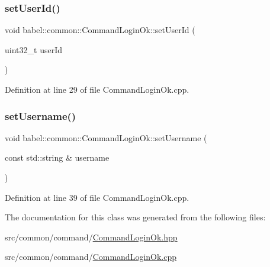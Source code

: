 \subsubsection{\texorpdfstring{set\+User\+Id()}{setUserId()}}
{\footnotesize\ttfamily void babel\+::common\+::\+Command\+Login\+Ok\+::set\+User\+Id (\begin{DoxyParamCaption}\item[{uint32\+\_\+t}]{user\+Id }\end{DoxyParamCaption})}



Definition at line 29 of file Command\+Login\+Ok.\+cpp.

\mbox{\label{classbabel_1_1common_1_1_command_login_ok_ad01f7bbbb944b3fe0f42fcf784ec134e}} 
\subsubsection{\texorpdfstring{set\+Username()}{setUsername()}}
{\footnotesize\ttfamily void babel\+::common\+::\+Command\+Login\+Ok\+::set\+Username (\begin{DoxyParamCaption}\item[{const std\+::string \&}]{username }\end{DoxyParamCaption})}



Definition at line 39 of file Command\+Login\+Ok.\+cpp.



The documentation for this class was generated from the following files\+:\begin{DoxyCompactItemize}
\item 
src/common/command/\mbox{\hyperlink{_command_login_ok_8hpp}{Command\+Login\+Ok.\+hpp}}\item 
src/common/command/\mbox{\hyperlink{_command_login_ok_8cpp}{Command\+Login\+Ok.\+cpp}}\end{DoxyCompactItemize}
